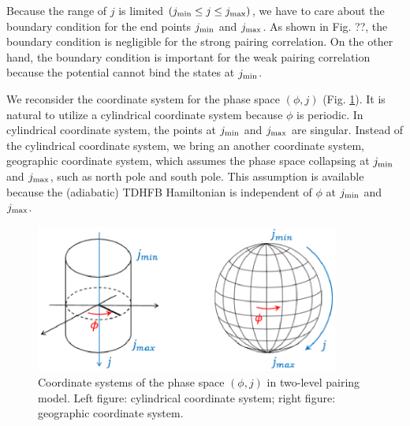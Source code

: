 \documentclass[11pt]{book} %
\begin{document}
Because the range of $j$ is limited $(j_{\rm min}\le j \le j_{\rm max})$, we have to care about the boundary condition for the end points $j_{\rm min}$ and $j_{\rm max}$. As shown in Fig. ??, the boundary condition is negligible for the strong pairing correlation. On the other hand, the boundary condition is important for the weak pairing correlation because the potential cannot bind the states at $j_{\rm min}$.

We reconsider the coordinate system for the phase space $(\phi,j)$ (Fig. \ref{coordinate}). It is natural to utilize 
a cylindrical coordinate system because $\phi$ is periodic. In cylindrical coordinate system, the points at $j_{\rm min}$ and $j_{\rm max}$ are singular. Instead of the cylindrical coordinate system, we bring an another coordinate system, geographic coordinate system, which assumes the phase space collapsing at $j_{\rm min}$ and  $j_{\rm max}$, such as north pole and south pole. This assumption is available because the (adiabatic) TDHFB Hamiltonian is independent of $\phi$ at $j_{\rm min}$ and $j_{\rm max}$. 


\begin{figure}[htbp]
 \begin{center}
  \includegraphics[width=100mm]{images/can-trans.eps}
 \end{center}
 \caption{Coordinate systems of the phase space $(\phi,j)$ in two-level pairing model. Left figure: cylindrical coordinate system; right figure: geographic coordinate system.}
 \label{coordinate}
\end{figure}
\end{document}
